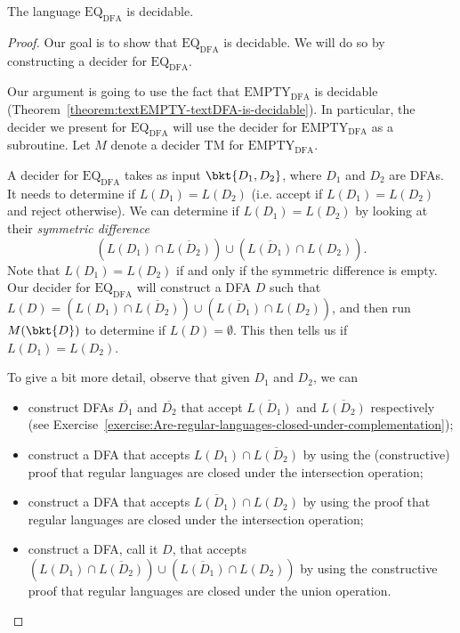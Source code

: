 \begin{flex}
\begin{theorem} \label{theorem:textEQ-textDFA-is-decidable}
The language $\mathrm{EQ}_\mathrm{DFA}$ is decidable.
\end{theorem}

\begin{proof}
Our goal is to show that $\mathrm{EQ}_\mathrm{DFA}$ is decidable. We will do so by constructing a decider for $\mathrm{EQ}_\mathrm{DFA}$. 

Our argument is going to use the fact that $\mathrm{EMPTY}_\mathrm{DFA}$ is decidable (Theorem~\ref{theorem:textEMPTY-textDFA-is-decidable}). In particular, the decider we present for $\mathrm{EQ}_\mathrm{DFA}$ will use the decider for $\mathrm{EMPTY}_\mathrm{DFA}$ as a subroutine. Let $M$ denote a decider TM for $\mathrm{EMPTY}_\mathrm{DFA}$.

A decider for $\mathrm{EQ}_\mathrm{DFA}$ takes as input $\bkt{D_1,D_2}$, where $D_1$ and $D_2$ are DFAs. It needs to determine if $L(D_1) = L(D_2)$ (i.e. accept if $L(D_1) = L(D_2)$ and reject otherwise). We can determine if $L(D_1) = L(D_2)$ by looking at their \emph{symmetric difference}
\[
(L(D_1) \cap \overline{L(D_2)}) \cup (\overline{L(D_1)} \cap L(D_2)).
\]
Note that $L(D_1) = L(D_2)$ if and only if the symmetric difference is empty. Our decider for $\mathrm{EQ}_\mathrm{DFA}$ will construct a DFA $D$ such that $L(D) = (L(D_1) \cap \overline{L(D_2)}) \cup (\overline{L(D_1)} \cap L(D_2))$, and then run $M(\bkt{D})$ to determine if $L(D) = \emptyset$. This then tells us if $L(D_1) = L(D_2)$. 

To give a bit more detail, observe that given $D_1$ and $D_2$, we can 
\begin{itemize}
    \item construct DFAs $\overline{D_1}$ and $\overline{D_2}$ that accept $\overline{L(D_1)}$ and $\overline{L(D_2)}$ respectively (see Exercise~\ref{exercise:Are-regular-languages-closed-under-complementation});
    \item construct a DFA that accepts $L(D_1) \cap \overline{L(D_2)}$ by using the (constructive) proof that regular languages are closed under the intersection operation;
    \item construct a DFA that accepts $\overline{L(D_1)} \cap L(D_2)$ by using the proof that regular languages are closed under the intersection operation;
    \item construct a DFA, call it $D$, that accepts $(L(D_1) \cap \overline{L(D_2)}) \cup (\overline{L(D_1)} \cap L(D_2))$ by using the constructive proof that regular languages are closed under the union operation.
\end{itemize} 


\end{proof}
\end{flex}

